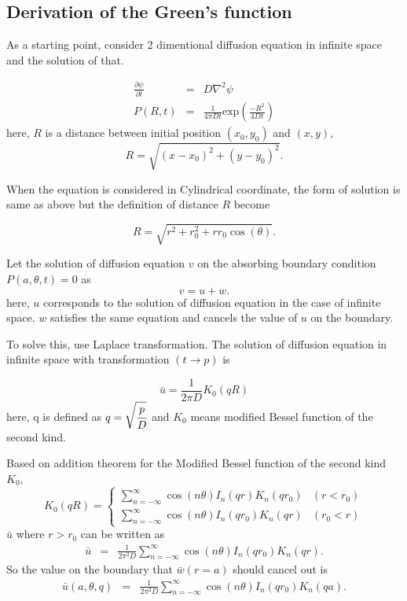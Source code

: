 \documentclass{article}
\begin{document}
\subsection{Derivation of the Green's function}

As a starting point, consider 2 dimentional diffusion equation in infinite space
and the solution of that.

\begin{eqnarray}
    \frac{\partial\psi}{\partial t} &=& D\nabla^2\psi \\
    P(R, t) &=& \frac{1}{4\pi Dt}\mathrm{exp}\left(\frac{-R^2}{4Dt}\right)
\end{eqnarray}
here, $R$ is a distance between initial position $(x_0, y_0)$ and $(x, y)$,
\begin{equation}
 R = \sqrt{(x-x_0)^2+(y-y_0)^2}.
\end{equation}

When the equation is considered in Cylindrical coordinate, the form of solution
 is same as above but the definition of distance $R$ become

\begin{equation}
    R = \sqrt{r^2+r_0^2+rr_0\cos(\theta)}.
\end{equation}

Let the solution of diffusion equation $v$ on the absorbing boundary condition
 $P(a, \theta, t) = 0$ as
\begin{equation}
    v = u + w.
\end{equation}
here, $u$ corresponds to the solution of diffusion equation in the case of
 infinite space. $w$ satisfies the same equation and cancels the value of $u$ on
 the boundary.

To solve this, use Laplace transformation.
 The solution of diffusion equation in infinite space with transformation
 $(t\rightarrow p)$ is

\begin{equation} \label{L-solution-infinite}
    \bar{u} = \frac{1}{2\pi D}K_0(qR)
\end{equation}
here, q is defined as $q = \sqrt{\cfrac{p}{D}}$ and $K_0$ means modified Bessel
 function of the second kind.

Based on addition theorem for the Modified Bessel function of the second kind $K_0$,
\[
    K_0(qR)
    = \begin{cases}
        \sum_{n = -\infty}^\infty \cos(n\theta)I_n(qr)K_n(qr_0) & (r < r_0) \\
        \sum_{n = -\infty}^\infty \cos(n\theta)I_n(qr_0)K_n(qr) & (r_0 < r )
      \end{cases}
\]
$\bar{u}$ where $r > r_0$ can be written as
\begin{eqnarray}
    \bar{u} &=& \frac{1}{2\pi^2D}\sum_{n = -\infty}^\infty
                \cos(n\theta)I_n(qr_0)K_n(qr).
\end{eqnarray}
So the value on the boundary that $\bar{w}(r=a)$ should cancel out is
\begin{eqnarray}
    \bar{u}(a,\theta,q) &=& \frac{1}{2\pi^2D}\sum_{n = -\infty}^\infty
                \cos(n\theta)I_n(qr_0)K_n(qa).
\end{eqnarray}
\end{document}
